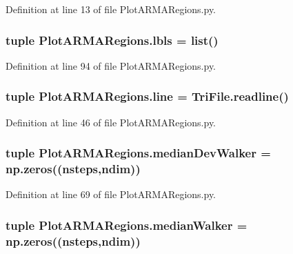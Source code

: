 Definition at line 13 of file Plot\-A\-R\-M\-A\-Regions.\-py.

\hypertarget{namespace_plot_a_r_m_a_regions_aeadeb0d1d3349eeeafd2ee3cf0c17c41}{
\subsubsection[{lbls}]{\setlength{\rightskip}{0pt plus 5cm}tuple Plot\-A\-R\-M\-A\-Regions.\-lbls = list()}}\label{namespace_plot_a_r_m_a_regions_aeadeb0d1d3349eeeafd2ee3cf0c17c41}


Definition at line 94 of file Plot\-A\-R\-M\-A\-Regions.\-py.

\hypertarget{namespace_plot_a_r_m_a_regions_a478b5b50b6eddf2098c4a31f8a83b86d}{
\subsubsection[{line}]{\setlength{\rightskip}{0pt plus 5cm}tuple Plot\-A\-R\-M\-A\-Regions.\-line = Tri\-File.\-readline()}}\label{namespace_plot_a_r_m_a_regions_a478b5b50b6eddf2098c4a31f8a83b86d}


Definition at line 46 of file Plot\-A\-R\-M\-A\-Regions.\-py.

\hypertarget{namespace_plot_a_r_m_a_regions_aebce0372a3a0163d83eb67756a668e9c}{
\subsubsection[{median\-Dev\-Walker}]{\setlength{\rightskip}{0pt plus 5cm}tuple Plot\-A\-R\-M\-A\-Regions.\-median\-Dev\-Walker = np.\-zeros(({\bf nsteps},{\bf ndim}))}}\label{namespace_plot_a_r_m_a_regions_aebce0372a3a0163d83eb67756a668e9c}


Definition at line 69 of file Plot\-A\-R\-M\-A\-Regions.\-py.

\hypertarget{namespace_plot_a_r_m_a_regions_a52850befe6ca5dd531f3da54183de7af}{
\subsubsection[{median\-Walker}]{\setlength{\rightskip}{0pt plus 5cm}tuple Plot\-A\-R\-M\-A\-Regions.\-median\-Walker = np.\-zeros(({\bf nsteps},{\bf ndim}))}}\label{namespace_plot_a_r_m_a_regions_a52850befe6ca5dd531f3da54183de7af}


